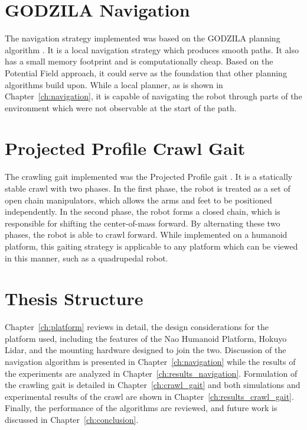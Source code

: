 \section{GODZILA Navigation}
The navigation strategy implemented was based on the GODZILA planning algorithm
\cite{Krishnamurthy2007}. It is a local navigation strategy which produces
smooth paths. It also has a small memory footprint and is computationally 
cheap. Based on the Potential Field approach, it could serve as the foundation
that other planning algorithms build upon. While a local planner, as is shown
in Chapter~\ref{ch:navigation}, it is capable of navigating the robot through
parts of the environment which were not observable at the start of the path.

\section{Projected Profile Crawl Gait}
The crawling gait implemented was the Projected Profile gait \cite{Brooks2015}.
It is a statically stable crawl with two phases. In the first phase, the robot
is treated as a set of open chain manipulators, which allows the arms and feet
to be positioned independently. In the second phase, the robot forms a closed
chain, which is responsible for shifting the center-of-mass forward.
By alternating these two phases, the robot is able to crawl forward.
While implemented on a humanoid platform, this gaiting strategy is applicable
to any platform which can be viewed in this manner, such as a quadrupedal robot.

\section{Thesis Structure}
Chapter~\ref{ch:platform} reviews in detail, the design considerations for the
platform used, including the features of the Nao Humanoid Platform, Hokuyo Lidar,
and the mounting hardware designed to join the two.
Discussion of the navigation algorithm is presented in 
Chapter~\ref{ch:navigation} while the results of the experiments are analyzed
in Chapter~\ref{ch:results_navigation}.
Formulation of the crawling gait is detailed in Chapter~\ref{ch:crawl_gait} and
both simulations and experimental results of the crawl are shown in 
Chapter~\ref{ch:results_crawl_gait}.
Finally, the performance of the algorithms are reviewed, and future work is
discussed in Chapter~\ref{ch:conclusion}.
